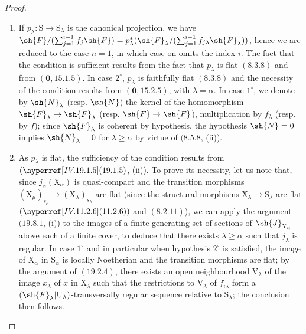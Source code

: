 \begin{proof}
\begin{enumerate}
\item[\rm(i)] If $p_\lambda:\mathrm{S}\to\mathrm{S}_\lambda$ is the canonical projection, we have $\sh{F}/(\sum_{j=1}^{i-1}f_j\sh{F})=p_\lambda^*(\sh{F}_\lambda/(\sum_{j=1}^{i-1}f_{j\lambda}\sh{F}_\lambda))$, hence we are reduced to the case $n=1$, in which case on omits the index $i$. The fact that the condition is sufficient results from the fact that $p_\lambda$ is flat $(8.3.8)$ and from $(\mathbf{0},15.1.5)$. In case $2^\circ$, $p_\lambda$ is faithfully flat $(8.3.8)$ and the necessity of the condition results from $(\mathbf{0},15.2.5)$, with $\lambda=\alpha$. In case $1^\circ$, we denote by $\sh{N}_\lambda$ (resp. $\sh{N}$) the kernel of the homomorphism $\sh{F}_\lambda\to\sh{F}_\lambda$ (resp. $\sh{F}\to\sh{F}$), multiplication by $f_\lambda$ (resp. by $f$); since $\sh{F}_\lambda$ is coherent by hypothesis, the hypothesis $\sh{N}=0$ implies $\sh{N}_\lambda=0$ for $\lambda\geqslant\alpha$ by virtue of $(8.5.8$, (ii)).
\item[\rm(ii)] As $p_\lambda$ is flat, the sufficiency of the condition results from $(\sref{IV.19.1.5}$, (ii)). To prove its necessity, let us note that, since $j_\alpha(\mathrm{X}_\alpha)$ is quasi-compact and the transition morphisms $(\mathrm{X}_\mu)_{s_\mu}\to(\mathrm{X}_\lambda)_{s_\lambda}$ are flat (since the structural morphisms $\mathrm{X}_\lambda\to\mathrm{S}_\lambda$ are flat $(\sref{IV.11.2.6})$ and $(8.2.11)$), we can apply the argument $(19.8.1$, (i)) to the images of a finite generating set of sections of $\sh{J}_{\mathrm{Y}_\alpha}$ above each of a finite cover, to deduce that there exists $\lambda\geqslant\alpha$ such that $j_\lambda$ is regular. In case $1^\circ$ and in particular when hypothesis $2^\circ$ is satisfied, the image of $\mathrm{X}_\alpha$ in $\mathrm{S}_\alpha$ is locally Noetherian and the transition morphisms are flat; by the argument of $(19.2.4)$, there exists an open neighbourhood $\mathrm{V}_\lambda$ of the image $x_\lambda$ of $x$ in $\mathrm{X}_\lambda$ such that the restrictions to $\mathrm{V}_\lambda$ of $f_{i\lambda}$ form a $(\sh{F}_\lambda|\mathrm{U}_\lambda)$-transversally regular sequence relative to $\mathrm{S}_\lambda$; the conclusion then follows.
\end{enumerate}
\end{proof}


